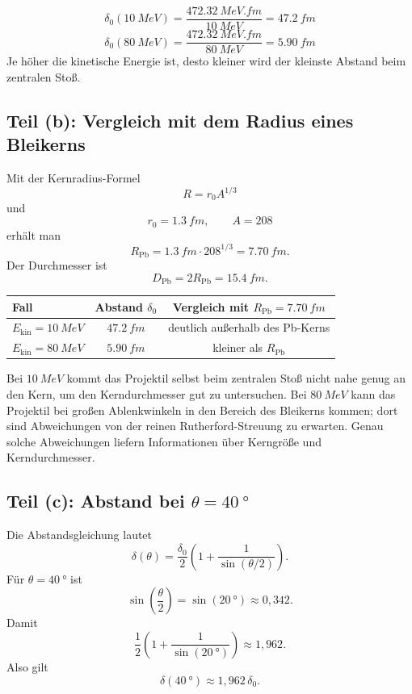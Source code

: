\documentclass[11pt,a4paper]{scrartcl}
\newcommand{\paren}[1]{\left( #1 \right)}
\begin{document}
\begin{answerbox}
\[
    \boxed{\delta_0(\SI{10}{MeV})=\frac{\SI{472.32}{MeV.fm}}{\SI{10}{MeV}}=\SI{47.2}{fm}}
\]
\[
    \boxed{\delta_0(\SI{80}{MeV})=\frac{\SI{472.32}{MeV.fm}}{\SI{80}{MeV}}=\SI{5.90}{fm}}
\]
Je h\"oher die kinetische Energie ist, desto kleiner wird der kleinste Abstand beim zentralen Sto\ss{}.
\end{answerbox}

\subsection{Teil (b): Vergleich mit dem Radius eines Bleikerns}

\begin{calculationbox}
Mit der Kernradius-Formel
\[
    R=r_0A^{1/3}
\]
und
\[
    r_0=\SI{1.3}{fm},\qquad A=208
\]
erh\"alt man
\[
    R_{\mathrm{Pb}}=\SI{1.3}{fm}\cdot 208^{1/3}=\SI{7.70}{fm}.
\]
Der Durchmesser ist
\[
    D_{\mathrm{Pb}}=2R_{\mathrm{Pb}}=\SI{15.4}{fm}.
\]
\end{calculationbox}

\begin{answerbox}
\begin{center}
\begin{tabular}{@{}lcc@{}}
\toprule
Fall & Abstand $\delta_0$ & Vergleich mit $R_{\mathrm{Pb}}=\SI{7.70}{fm}$ \\
\midrule
$E_{\mathrm{kin}}=\SI{10}{MeV}$ & $\SI{47.2}{fm}$ & deutlich au\ss{}erhalb des Pb-Kerns \\
$E_{\mathrm{kin}}=\SI{80}{MeV}$ & $\SI{5.90}{fm}$ & kleiner als $R_{\mathrm{Pb}}$ \\
\bottomrule
\end{tabular}
\end{center}
Bei $\SI{10}{MeV}$ kommt das Projektil selbst beim zentralen Sto\ss{} nicht nahe genug an den Kern, um den Kerndurchmesser gut zu untersuchen. Bei $\SI{80}{MeV}$ kann das Projektil bei gro\ss{}en Ablenkwinkeln in den Bereich des Bleikerns kommen; dort sind Abweichungen von der reinen Rutherford-Streuung zu erwarten. Genau solche Abweichungen liefern Informationen \"uber Kerngr\"o\ss{}e und Kerndurchmesser.
\end{answerbox}

\subsection{Teil (c): Abstand bei $\theta=\SI{40}{\degree}$}

\begin{calculationbox}
Die Abstandsgleichung lautet
\[
    \delta(\theta)=\frac{\delta_0}{2}\paren{1+\frac{1}{\sin(\theta/2)}}.
\]
F\"ur $\theta=\SI{40}{\degree}$ ist
\[
    \sin\paren{\frac{\theta}{2}}=\sin(\SI{20}{\degree})\approx 0{,}342.
\]
Damit
\[
    \frac{1}{2}\paren{1+\frac{1}{\sin(\SI{20}{\degree})}}
    \approx 1{,}962.
\]
Also gilt
\[
    \delta(\SI{40}{\degree})\approx 1{,}962\,\delta_0.
\]
\end{calculationbox}
\end{document}
